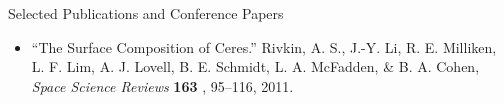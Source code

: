 \documentclass[11pt,oneside]{article}
\newenvironment{ressection}[1]{
	\vspace{4pt}
	{\Large#1}
	\begin{itemize}
	\vspace{3pt}
}{
	\end{itemize}
}
\newcommand{\resitem}[1]{
	\vspace{-4pt}
	\item \begin{flushleft} #1 \end{flushleft}
}
\begin{document}
\begin{ressection}{Selected Publications and Conference Papers}
\resitem{ ``The Surface Composition of Ceres.'' Rivkin, A. S., J.-Y. Li, R. E. 
Milliken, L. F. Lim, A. J. Lovell, B. E. Schmidt, L. A. McFadden, 
\& B. A. Cohen,  {\it Space Science Reviews} {\bf 163 }, 95--116, 2011.  
}













\end{ressection}
\end{document}

